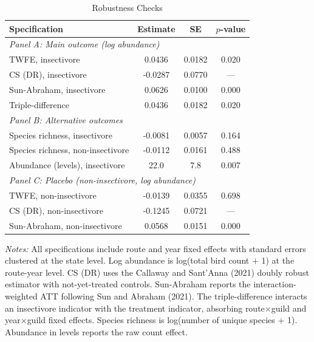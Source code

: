 \begin{table}[t]
\centering
\caption{Robustness Checks}
\label{tab:robustness}
\begin{tabular}{lccc}
\toprule
Specification & Estimate & SE & $p$-value \\
\midrule
\multicolumn{4}{l}{\textit{Panel A: Main outcome (log abundance)}} \\[3pt]
TWFE, insectivore & 0.0436 & 0.0182 & 0.020 \\
CS (DR), insectivore & -0.0287 & 0.0770 & --- \\
Sun-Abraham, insectivore & 0.0626 & 0.0100 & 0.000 \\
Triple-difference & 0.0436 & 0.0182 & 0.020 \\
[6pt]
\multicolumn{4}{l}{\textit{Panel B: Alternative outcomes}} \\[3pt]
Species richness, insectivore & -0.0081 & 0.0057 & 0.164 \\
Species richness, non-insectivore & -0.0112 & 0.0161 & 0.488 \\
Abundance (levels), insectivore & 22.0 & 7.8 & 0.007 \\
[6pt]
\multicolumn{4}{l}{\textit{Panel C: Placebo (non-insectivore, log abundance)}} \\[3pt]
TWFE, non-insectivore & -0.0139 & 0.0355 & 0.698 \\
CS (DR), non-insectivore & -0.1245 & 0.0721 & --- \\
Sun-Abraham, non-insectivore & 0.0568 & 0.0151 & 0.000 \\
\bottomrule
\end{tabular}
\begin{tablenotes}[flushleft]
\item \textit{Notes:} All specifications include route and year fixed effects with standard errors clustered at the state level. Log abundance is log(total bird count $+$ 1) at the route-year level. CS (DR) uses the Callaway and Sant'Anna (2021) doubly robust estimator with not-yet-treated controls. Sun-Abraham reports the interaction-weighted ATT following Sun and Abraham (2021). The triple-difference interacts an insectivore indicator with the treatment indicator, absorbing route$\times$guild and year$\times$guild fixed effects. Species richness is log(number of unique species $+$ 1). Abundance in levels reports the raw count effect.
\end{tablenotes}
\end{table}

